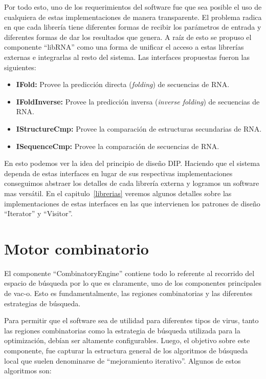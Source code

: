 Por todo esto, uno de los requerimientos del software fue que sea posible el uso
de cualquiera de estas implementaciones de manera transparente. El problema
radica en que cada librer\'ia tiene diferentes formas de recibir los
par\'ametros de entrada y diferentes formas de dar los resultados que genera. A
ra\'iz de esto se propuso el componente ``libRNA'' como una forma de unificar el
acceso a estas librer\'ias externas e integrarlas al resto del sistema. Las
interfaces propuestas fueron las siguientes:

\begin{itemize}
 \item \textbf{IFold:} Provee la predicci\'on directa (\textit{folding})
de secuencias de \ac{RNA}.
 \item \textbf{IFoldInverse:} Provee la predicci\'on inversa (\textit{inverse
folding}) de secuencias de \ac{RNA}.
 \item \textbf{IStructureCmp:} Provee la comparaci\'on de estructuras
secundarias
de \ac{RNA}.
 \item \textbf{ISequenceCmp:} Provee la comparaci\'on de secuencias de
\ac{RNA}.
\end{itemize}

En esto podemos ver la idea del principio de dise\~no \ac{DIP}. Haciendo que el
sistema dependa de estas interfaces en lugar de sus respectivas
implementaciones conseguimos abstraer los detalles de cada librer\'ia externa y
logramos un software mas vers\'atil. En el capitulo~\ref{librerias} veremos
algunos detalles sobre las implementaciones de estas interfaces en las que
intervienen los patrones de dise\~no ``Iterator'' y ``Visitor''.

\section{Motor combinatorio}

El componente ``CombinatoryEngine'' contiene todo lo referente al recorrido del
espacio de b\'usqueda por lo que es claramente, uno de los componentes
principales de \ac{vac-o}. Esto es fundamentalmente, las regiones
combinatorias y las diferentes estrategias de b\'usqueda.

Para permitir que el software sea de utilidad para diferentes tipos de virus,
tanto las regiones combinatorias como la estrategia de b\'usqueda utilizada
para la optimizaci\'on, deb\'ian ser altamente configurables. Luego, el
objetivo sobre este componente, fue capturar la estructura general de los
algoritmos de b\'usqueda local que suelen denominarse de ``mejoramiento
iterativo''. Algunos de estos algoritmos son:

